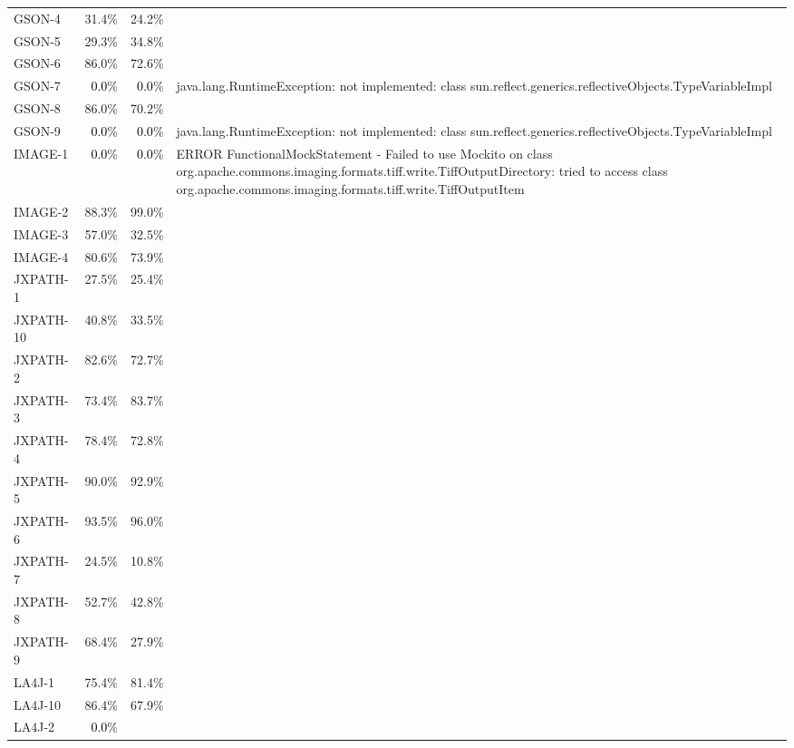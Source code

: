 \begin{tabular}{ l rrrrrrr rrrrrrrr}
GSON-4 & 31.4\% & 24.2\%\\ 
GSON-5 & 29.3\% & 34.8\%\\ 
GSON-6 & 86.0\% & 72.6\%\\ 
GSON-7 & \cellcolor{light-gray} \textcolor{black}{0.0}\% &
                                                           \cellcolor{light-gray}
                                                           \textcolor{black}{0.0}\%
 & \multicolumn{13}{l}{java.lang.RuntimeException: not implemented: class sun.reflect.generics.reflectiveObjects.TypeVariableImpl}\\ 
GSON-8 & 86.0\% & 70.2\%\\ 
GSON-9 & \cellcolor{light-gray} \textcolor{black}{0.0}\% &
                                                           \cellcolor{light-gray} \textcolor{black}{0.0}\%
 & \multicolumn{13}{l}{java.lang.RuntimeException: not implemented: class sun.reflect.generics.reflectiveObjects.TypeVariableImpl}\\ 
IMAGE-1 & \cellcolor{light-gray} \textcolor{black}{0.0}\% &
                                                            \cellcolor{light-gray}
                                                            \textcolor{black}{0.0}\%
 & \multicolumn{13}{l}{ERROR FunctionalMockStatement - Failed to use Mockito on class org.apache.commons.imaging.formats.tiff.write.TiffOutputDirectory: tried to access class org.apache.commons.imaging.formats.tiff.write.TiffOutputItem}\\ 
IMAGE-2 & 88.3\% & 99.0\%\\ 
IMAGE-3 & 57.0\% & 32.5\%\\ 
IMAGE-4 & 80.6\% & 73.9\%\\ 
JXPATH-1 & 27.5\% & 25.4\%\\ 
JXPATH-10 & 40.8\% & 33.5\%\\ 
JXPATH-2 & 82.6\% & 72.7\%\\ 
JXPATH-3 & 73.4\% & 83.7\%\\ 
JXPATH-4 & 78.4\% & 72.8\%\\ 
JXPATH-5 & 90.0\% & 92.9\%\\ 
JXPATH-6 & 93.5\% & 96.0\%\\ 
JXPATH-7 & 24.5\% & 10.8\%\\ 
JXPATH-8 & 52.7\% & 42.8\%\\ 
JXPATH-9 & 68.4\% & 27.9\%\\ 
LA4J-1 & 75.4\% & 81.4\%\\ 
LA4J-10 & 86.4\% & 67.9\%\\ 
LA4J-2 & \cellcolor{light-gray} \textcolor{black}{0.0}\% &

\end{tabular}
